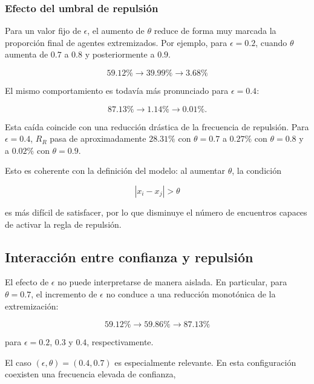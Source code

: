 \documentclass[11pt,a4paper]{article}
\begin{document}
\subsubsection{Efecto del umbral de repulsión}

Para un valor fijo de $\epsilon$, el aumento de $\theta$ reduce de forma muy marcada la proporción final de agentes extremizados. Por ejemplo, para $\epsilon=0.2$, cuando $\theta$ aumenta de $0.7$ a $0.8$ y posteriormente a $0.9$.

\begin{equation}
59.12\% \rightarrow 39.99\% \rightarrow 3.68\%
\end{equation}


El mismo comportamiento es todavía más pronunciado para $\epsilon=0.4$:

\begin{equation}
87.13\% \rightarrow 1.14\% \rightarrow 0.01\%.
\end{equation}

Esta caída coincide con una reducción drástica de la frecuencia de repulsión. Para $\epsilon=0.4$, $R_R$ pasa de aproximadamente $28.31\%$ con $\theta=0.7$ a $0.27\%$ con $\theta=0.8$ y a $0.02\%$ con $\theta=0.9$.

Esto es coherente con la definición del modelo: al aumentar $\theta$, la condición

\begin{equation}
|x_i-x_j|>\theta
\end{equation}

es más difícil de satisfacer, por lo que disminuye el número de encuentros capaces de activar la regla de repulsión.

\subsection{Interacción entre confianza y repulsión}

El efecto de $\epsilon$ no puede interpretarse de manera aislada. En particular, para $\theta=0.7$, el incremento de $\epsilon$ no conduce a una reducción monotónica de la extremización:

\begin{equation}
59.12\% \rightarrow 59.86\% \rightarrow 87.13\%
\end{equation}

para $\epsilon=0.2$, $0.3$ y $0.4$, respectivamente.

El caso $(\epsilon,\theta)=(0.4,0.7)$ es especialmente relevante. En esta configuración coexisten una frecuencia elevada de confianza,
\end{document}
